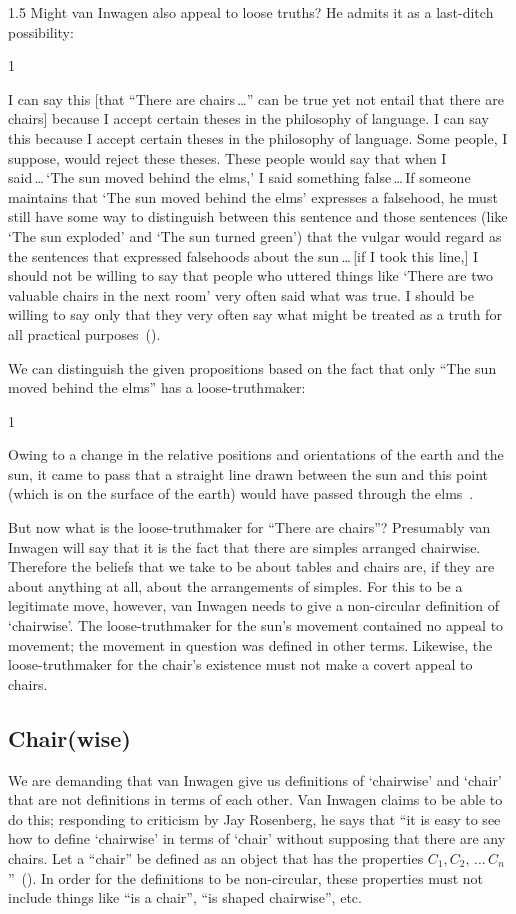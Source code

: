 \documentclass[11pt]{article}
\newenvironment{squote}{%
	\begin{spacing}{1}
	\begin{list}{}{%
	\setlength{\labelwidth}{0pt}%
	\rightmargin\leftmargin%
	}
	\item\relax
	}{%
	\end{list}%
	\end{spacing}
	}
\begin{document}
\begin{spacing}{1.5}
Might van Inwagen also appeal to loose truths? He admits it as a last-ditch possibility:
\begin{squote}
I can say this [that ``There are chairs\,\ldots '' can be true yet not entail that there are chairs] because I accept certain theses in the philosophy of language. I can say this because I accept certain theses in the philosophy of language. Some people, I suppose, would reject these theses. These people would say that when I said\,\ldots\,`The sun moved behind the elms,' I said something false\,\ldots\,If someone maintains that `The sun moved behind the elms' expresses a falsehood, he must still have some way to distinguish between this sentence and those sentences (like `The sun exploded' and `The sun turned green') that the vulgar would regard as the sentences that expressed falsehoods about the sun\,\ldots\,[if I took this line,] I should not be willing to say that people who uttered things like `There are two valuable chairs in the next room' very often said what was true. I should be willing to say only that they very often say what might be treated as a truth for all practical purposes~(\citeyear[102--103]{inwagen1995}).
\end{squote}
We can distinguish the given propositions based on the fact that only ``The sun moved behind the elms'' has a loose-truthmaker:
\begin{squote}
Owing to a change in the relative positions and orientations of the earth and the sun, it came to pass that a straight line drawn between the sun and this point (which is on the surface of the earth) would have passed through the elms~\citep[112--113]{inwagen1995}.
\end{squote}

But now what is the loose-truthmaker for ``There are chairs''? Presumably van Inwagen will say that it is the fact that there are simples arranged chairwise. Therefore the beliefs that we take to be about tables and chairs are, if they are about anything at all, about the arrangements of simples. For this to be a legitimate move, however, van Inwagen needs to give a non-circular definition of `chairwise'. The loose-truthmaker for the sun's movement contained no appeal to movement; the movement in question was defined in other terms. Likewise, the loose-truthmaker for the chair's existence must not make a covert appeal to chairs.

\subsection{Chair(wise)}
We are demanding that van Inwagen give us definitions of `chairwise' and `chair' that are not definitions in terms of each other. Van Inwagen claims to be able to do this; responding to criticism by Jay Rosenberg, he says that ``it is easy to see how to define `chairwise' in terms of `chair' without supposing that there are any chairs. Let a ``chair'' be defined as an object that has the properties $C_{1}, C_{2},\,\dots\,C_{n}$''~(\citeyear[719]{inwagen1993b}). In order for the definitions to be non-circular, these properties must not include things like ``is a chair'', ``is shaped chairwise'', etc.


\end{spacing}
\end{document}
